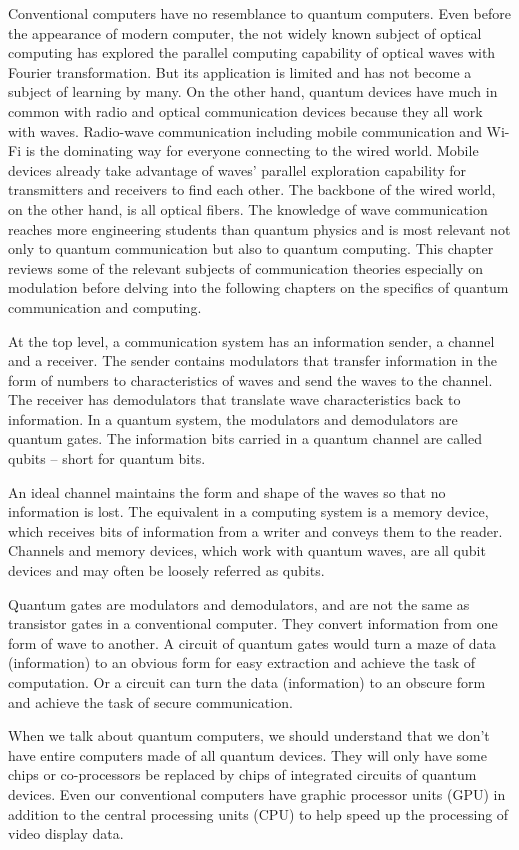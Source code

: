 Conventional computers have no resemblance to quantum computers. Even before the appearance of modern computer, the not widely known subject of optical computing has explored the parallel computing capability of optical waves with Fourier transformation. But its application is limited and has not become a subject of learning by many. On the other hand, quantum devices have much in common with radio and optical communication devices because they all work with waves. Radio-wave communication including mobile communication and Wi-Fi is the dominating way for everyone connecting to the wired world. Mobile devices already take advantage of waves' parallel exploration capability for transmitters and receivers to find each other. The backbone of the wired world, on the other hand, is all optical fibers. The knowledge of wave communication reaches more engineering students than quantum physics and is most relevant not only to quantum communication but also to quantum computing. This chapter reviews some of the relevant subjects of communication theories especially on modulation before delving into the following chapters on the specifics of quantum communication and computing.

At the top level, a communication system has an information sender, a channel and a receiver. The sender contains modulators that transfer information in the form of numbers to characteristics of waves and send the waves to the channel. The receiver has demodulators that translate wave characteristics back to information. In a quantum system, the modulators and demodulators are quantum gates. The information bits carried in a quantum channel are called qubits -- short for quantum bits.

An ideal channel maintains the form and shape of the waves so that no information is lost. The equivalent in a computing system is a memory device, which receives bits of information from a writer and conveys them to the reader. Channels and memory devices, which work with quantum waves, are all qubit devices and may often be loosely referred as qubits.

Quantum gates are modulators and demodulators, and are not the same as transistor gates in a conventional computer. They convert information from one form of wave to another. A circuit of quantum gates would turn a maze of data (information) to an obvious form for easy extraction and achieve the task of computation. Or a circuit can turn the data (information) to an obscure form and achieve the task of secure communication.

When we talk about quantum computers, we should understand that we don't have entire computers made of all quantum devices. They will only have some chips or co-processors be replaced by chips of integrated circuits of quantum devices. Even our conventional computers have graphic processor units (GPU) in addition to the central processing units (CPU) to help speed up the processing of video display data.